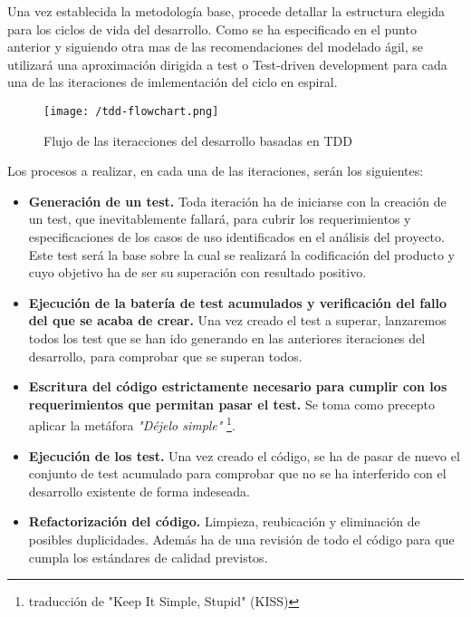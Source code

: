 Una vez establecida la metodología base, procede detallar la estructura elegida para los ciclos de vida del desarrollo. 
Como se ha especificado en el punto anterior y siguiendo otra mas de las recomendaciones del modelado ágil,
se utilizará una aproximación dirigida a test o Test-driven development para cada una de las iteraciones de imlementación del ciclo en espiral. 

\begin{figure}[!h]
\begin{center}
\texttt{[image: /tdd-flowchart.png]}
\caption{Flujo de las iteracciones del desarrollo basadas en TDD}
\label{fig:tdd-flowchart}
\end{center}
\end{figure}

Los procesos a realizar, en cada una de las iteraciones, serán los siguientes:

\begin{itemize}
\item \textbf{Generación de un test.} Toda iteración ha de iniciarse con la creación de un test, que inevitablemente fallará,
para cubrir los requerimientos y especificaciones de los casos de uso identificados en el análisis del proyecto. 
Este test será la base sobre la cual se realizará la codificación del producto y cuyo objetivo ha de ser su superación con resultado positivo. 

\item \textbf{Ejecución de la batería de test acumulados y verificación del fallo del que se acaba de crear.} Una vez creado el test a superar, 
lanzaremos todos los test que se han ido generando en las anteriores iteraciones del desarrollo, para comprobar que se superan todos. 

\item \textbf{Escritura del código estrictamente necesario para cumplir con los requerimientos que permitan pasar el test.} Se toma como precepto 
aplicar la metáfora \textit{"Déjelo simple"} \footnote{traducción de "Keep It Simple, Stupid" (KISS) }. 

\item \textbf{Ejecución de los test.} Una vez creado el código, se ha de pasar de nuevo el conjunto de test acumulado 
para comprobar que no se ha interferido con el desarrollo existente de forma indeseada. 

\item \textbf{Refactorización del código.} Limpieza, reubicación y eliminación de posibles duplicidades. Además ha de una revisión de todo 
el código para que cumpla los estándares de calidad previstos.
\end{itemize}

